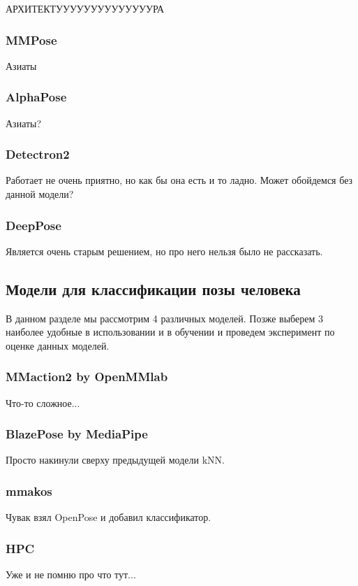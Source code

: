 \hfill \break
АРХИТЕКТУУУУУУУУУУУУУУРА


\subsubsection{MMPose}

Азиаты

\subsubsection{AlphaPose}

Азиаты?

\subsubsection{Detectron2}

Работает не очень приятно, но как бы она есть и то ладно. Может обойдемся без данной модели?

\subsubsection{DeepPose}

Является очень старым решением, но про него нельзя было не рассказать.


\subsection{Модели для классификации позы человека}

В данном разделе мы рассмотрим 4 различных моделей. Позже выберем 3 наиболее удобные в использовании и в обучении и проведем эксперимент по оценке данных моделей.

\subsubsection{MMaction2 by OpenMMlab}

Что-то сложное...

\subsubsection{BlazePose by MediaPipe}

Просто накинули сверху предыдущей модели kNN.

\subsubsection{mmakos}

Чувак взял OpenPose и добавил классификатор.

\subsubsection{HPC}

Уже и не помню про что тут...

\newpage